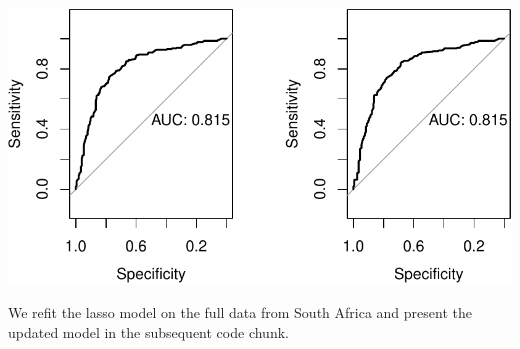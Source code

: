 \documentclass[
  letterpaper,
]{latex/krantz}
\begin{document}
\begin{center}
\includegraphics[width=1\textwidth,height=\textheight]{book/cs_regression_files/figure-pdf/unnamed-chunk-5-1.pdf}
\end{center}

We refit the lasso model on the full data from South Africa and present
the updated model in the subsequent code chunk.
\end{document}
